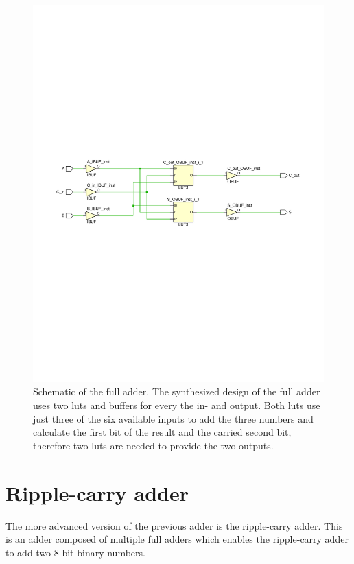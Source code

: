 \begin{figure}[h]
	\centering
	\includegraphics[width=\linewidth, trim=0mm 110mm 0mm 110mm]{./L1/E4/schematic.pdf}
	\caption{Schematic of the full adder. The synthesized design of the full adder uses two \glspl{lut} and buffers for every the in- and output. Both \glspl{lut} use just three of the six available inputs to add the three numbers and calculate the first bit of the result and the carried second bit, therefore two \glspl{lut} are needed to provide the two outputs.}
	\label{fig: Full Adder schematic}
\end{figure}



\section{Ripple-carry adder}

The more advanced version of the previous adder is the ripple-carry adder. This is an adder composed of multiple full adders which enables the ripple-carry adder to add two 8-bit binary numbers.


